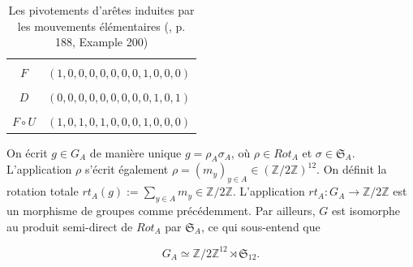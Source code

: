 \documentclass[french]{report}
\begin{document}
\begin{table}[h!]
  \centering
  \begin{tabular}{|c|c|}
    \hline \\
    $F$ & $(1,0,0,0,0,0,0,0,1,0,0,0)$ \\
    \hline \\
    $D$ & $(0,0,0,0,0,0,0,0,0,1,0,1)$ \\
    \hline \\
    $F \circ U$ & $(1,0,1,0,1,0,0,0,1,0,0,0)$ \\
    \hline
  \end{tabular}

  \caption{Les pivotements d'arêtes induites par les mouvements élémentaires (\cite{math_rubik}, p. 188, Example 200)}
  \label{tableau_orientations_aretes}

\end{table}


On écrit $g \in G_A$ de manière unique $g = \rho_A \sigma_A$, où $\rho \in Rot_A$ et $\sigma \in \mathfrak{S}_{A} $. L'application $\rho$ s'écrit également $\rho = (m_y) _{y \in A} \in (\mathbb{Z}/{ 2 }\mathbb{Z}) ^{12}$. On définit la rotation totale $rt_A(g) := \sum_{y \in A} m_y \in \mathbb{Z}/{ 2 }\mathbb{Z} $. L'application $rt_A : G_A \to \mathbb{Z}/{ 2 }\mathbb{Z}$ est un morphisme de groupes comme précédemment. Par ailleurs, $G$ est isomorphe au produit semi-direct de $Rot_A$ par $\mathfrak{S}_{A} $, ce qui sous-entend que

$$ G_A \simeq \mathbb{Z}/{ 2 }\mathbb{Z} ^{12} \rtimes \mathfrak{S}_{12}. $$


\end{document}
